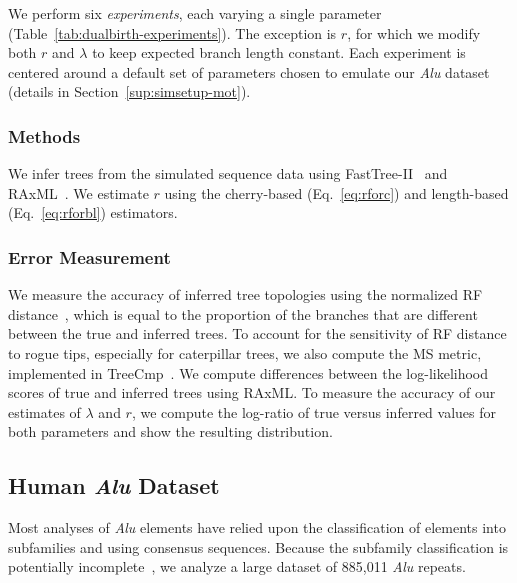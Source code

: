 We perform six \textit{experiments}, each varying a single parameter (Table~\ref{tab:dualbirth-experiments}). The exception is $r$, for which we modify both $r$ and $\lambda$ to keep expected branch length constant. Each experiment is centered around a default set of parameters chosen to emulate our \textit{Alu} dataset (details in Section~\ref{sup:simsetup-mot}).

\subsubsection{Methods}
We infer trees from the simulated sequence data using FastTree-II~\cite{Price2010} and RAxML~\cite{Stamatakis2014}. We estimate $r$ using the cherry-based (Eq.~\ref{eq:rforc}) and length-based (Eq.~\ref{eq:rforbl}) estimators.

\subsubsection{Error Measurement}
We measure the accuracy of inferred tree topologies using the normalized \gls{RF} distance~\cite{Robinson1981}, which is equal to the proportion of the branches that are different between the true and inferred trees. To account for the sensitivity of \gls{RF} distance to rogue tips, especially for caterpillar trees, we also compute the \gls{MS} metric, implemented in TreeCmp~\cite{Bogdanowicz2012}. We compute differences between the log-likelihood scores of true and inferred trees using RAxML. To measure the accuracy of our estimates of $\lambda$ and $r$, we compute the log-ratio of true versus inferred values for both parameters and show the resulting distribution.

\subsection{Human \textit{Alu} Dataset}
Most analyses of \textit{Alu} elements have relied upon the classification of elements into subfamilies and using consensus sequences. Because the subfamily classification is potentially incomplete~\cite{Price2004}, we analyze a large dataset of 885,011 \textit{Alu} repeats.

